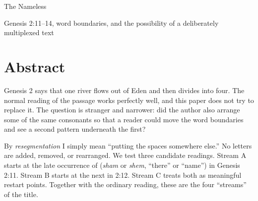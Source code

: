 

\newcommand{\hebrew}[1]{\heb{#1}}

\newcommand{\GridTable}[2]{%
  \par\smallskip
  \begin{center}
  \renewcommand{\arraystretch}{1.22}%
  \setlength{\tabcolsep}{5pt}%
  \begin{tabular}{#1}
  \hline
  #2
  \end{tabular}
  \end{center}
  \smallskip
}



\pagestyle{plain}
\def\CurrentBook{We Academy}%
\def\CurrentTitleBook{We Academy}%
\def\CurrentApocryphaHeader{We Academy}%
\def\CurrentChapter{The Four Streams}%
%


\begin{center}
{\large The Nameless\par}
\vspace{0.35em}
{\small Genesis 2:11--14, word boundaries, and the possibility of a deliberately multiplexed text\par}
\end{center}

\section*{Abstract}

Genesis 2 says that one river flows out of Eden and then divides into four. The normal reading of the passage works perfectly well, and this paper does not try to replace it. The question is stranger and narrower: did the author also arrange some of the same consonants so that a reader could move the word boundaries and see a second pattern underneath the first?

By \emph{resegmentation} I simply mean ``putting the spaces somewhere else.'' No letters are added, removed, or rearranged. We test three candidate readings. Stream A starts at the late occurrence of \hebrew{שם} (\textit{sham} or \textit{shem}, ``there'' or ``name'') in Genesis 2:11. Stream B starts at the next \hebrew{שם} in 2:12. Stream C treats both as meaningful restart points. Together with the ordinary reading, these are the four ``streams'' of the title.

